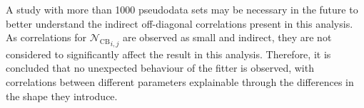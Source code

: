A study with more than 1000 pseudodata sets may be necessary in the future to better understand the indirect off-diagonal correlations present in this analysis.
As correlations for ${\mathcal{N}_{\mathrm{CB}}}_{i,j}$ are observed as small and indirect, they are not considered to significantly affect the result in this analysis.
Therefore, it is concluded that no unexpected behaviour of the fitter is observed, with correlations between different parameters explainable through the differences in the \PDF shape they introduce.